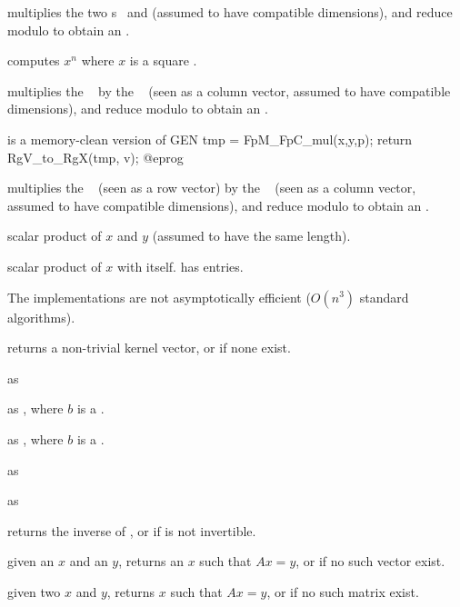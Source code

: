  multiplies the two s~
and  (assumed to have compatible dimensions), and reduce modulo
 to obtain an .

 computes $x^n$ where $x$ is a
square .

 multiplies the ~
by the ~ (seen as a column vector, assumed to have compatible
dimensions), and reduce modulo  to obtain an .

 is a memory-clean
version of
\bprog
  GEN tmp = FpM_FpC_mul(x,y,p);
  return RgV_to_RgX(tmp, v);
@eprog

 multiplies the ~
(seen as a row vector) by the ~ (seen as a column vector,
assumed to have compatible dimensions), and reduce modulo  to obtain
an .

 scalar product of
$x$ and $y$ (assumed to have the same length).

 scalar product of $x$ with itself.
has  entries.

 The implementations are not
asymptotically efficient ($O(n^3)$ standard algorithms).

 returns a non-trivial kernel vector,
or  if none exist.

 as 

 as , where $b$ is a
.

 as , where $b$
is a .

 as 

 as 

 returns the inverse of , or
 if  is not invertible.

 given an  $x$ and an  $y$, returns an $x$ such that $Ax =
 y$, or  if no such vector exist.

given two  $x$ and $y$, returns $x$ such that $Ax = y$, or 
if no such matrix exist.

